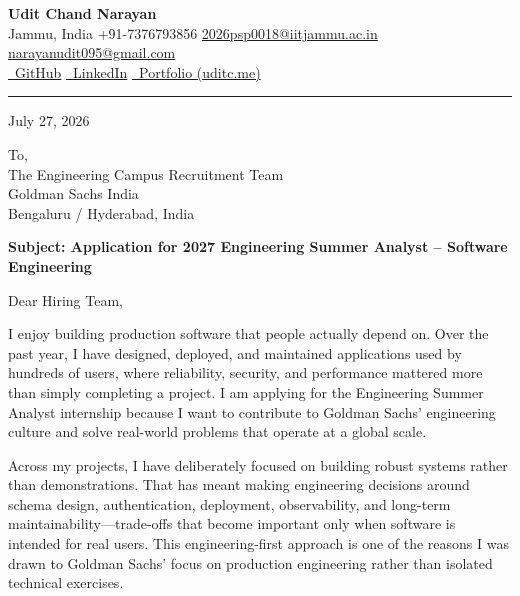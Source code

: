 \documentclass[11pt,a4paper]{article}
\begin{document}
\pagestyle{empty}

\begin{center}
    {\LARGE \textbf{Udit Chand Narayan}} \\
    \vspace{4pt}
    {\small Jammu, India \quad \textbar \quad +91-7376793856 \quad \textbar \quad \href{mailto:2026psp0018@iitjammu.ac.in}{2026psp0018@iitjammu.ac.in} \quad \textbar \quad \href{mailto:narayanudit095@gmail.com}{narayanudit095@gmail.com}} \\
    \vspace{3pt}
    {\small 
    \href{https://github.com/anoonimouse}{\faGithub\ GitHub} \quad \textbar \quad 
    \href{https://linkedin.com/in/udit-chand-narayan-642253228}{\faLinkedin\ LinkedIn} \quad \textbar \quad 
    \href{https://uditc.me}{\faGlobe\ Portfolio (uditc.me)}
    }
\end{center}
\vspace{1pt}
\hrule
\vspace{0.8em}

\hfill July 27, 2026

\vspace{0.3em}
\noindent To,\\
The Engineering Campus Recruitment Team\\
Goldman Sachs India\\
Bengaluru / Hyderabad, India

\vspace{0.5em}
\noindent \textbf{Subject: Application for 2027 Engineering Summer Analyst -- Software Engineering}

\vspace{0.5em}
Dear Hiring Team,

I enjoy building production software that people actually depend on. Over the past year, I have designed, deployed, and maintained applications used by hundreds of users, where reliability, security, and performance mattered more than simply completing a project. I am applying for the Engineering Summer Analyst internship because I want to contribute to Goldman Sachs' engineering culture and solve real-world problems that operate at a global scale.

Across my projects, I have deliberately focused on building robust systems rather than demonstrations. That has meant making engineering decisions around schema design, authentication, deployment, observability, and long-term maintainability---trade-offs that become important only when software is intended for real users. This engineering-first approach is one of the reasons I was drawn to Goldman Sachs' focus on production engineering rather than isolated technical exercises.
\end{document}
